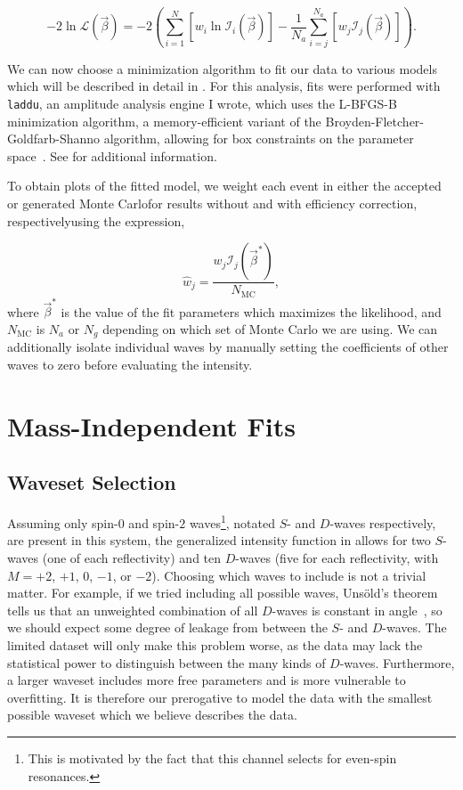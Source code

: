\begin{equation}
  -2\ln\mathcal{L}(\vec{\beta}) = -2\left(\sum_{i=1}^N\left[w_i\ln\mathcal{I}_i(\vec{\beta})\right] - \frac{1}{N_a} \sum_{i=j}^{N_a}\left[w_j\mathcal{I}_j(\vec{\beta})\right]\right).
\end{equation}

We can now choose a minimization algorithm to fit our data to various models which will be described in detail in . For this analysis, fits were performed with \texttt{laddu}, an amplitude analysis engine I wrote, which uses the L-BFGS-B minimization algorithm, a memory-efficient variant of the Broyden-Fletcher-Goldfarb-Shanno algorithm, allowing for box constraints on the parameter space~\cite{Byrd1995}. See  for additional information.

To obtain plots of the fitted model, we weight each event in either the accepted or generated Monte Carlo\textemdash for results without and with efficiency correction, respectively\textemdash using the expression,

\begin{equation}
  \hat{w}_j = \frac{w_j \mathcal{I}_j(\vec{\beta}^*)}{N_\text{MC}},
\end{equation}
where $\vec{\beta}^*$ is the value of the fit parameters which maximizes the likelihood, and $N_\text{MC}$ is $N_a$ or $N_g$ depending on which set of Monte Carlo we are using. We can additionally isolate individual waves by manually setting the coefficients of other waves to zero before evaluating the intensity.

\section{Mass-Independent Fits}\label{sec:mass-independent-fits}

\subsection{Waveset Selection}

Assuming only spin-$0$ and spin-$2$ waves\footnote{This is motivated by the fact that this channel selects for even-spin resonances.}, notated $S$- and $D$-waves respectively, are present in this system, the generalized intensity function in  allows for two $S$-waves (one of each reflectivity) and ten $D$-waves (five for each reflectivity, with $M=+2$, $+1$, $0$, $-1$, or $-2$). Choosing which waves to include is not a trivial matter. For example, if we tried including all possible waves, Uns\"old's theorem tells us that an unweighted combination of all $D$-waves is constant in angle~\cite{Unsld1927}, so we should expect some degree of leakage from between the $S$- and $D$-waves. The limited dataset will only make this problem worse, as the data may lack the statistical power to distinguish between the many kinds of $D$-waves. Furthermore, a larger waveset includes more free parameters and is more vulnerable to overfitting. It is therefore our prerogative to model the data with the smallest possible waveset which we believe describes the data.


